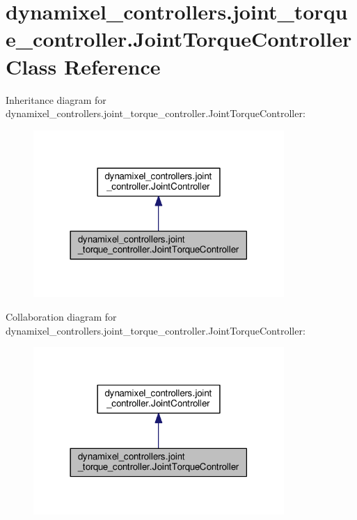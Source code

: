 \hypertarget{classdynamixel__controllers_1_1joint__torque__controller_1_1_joint_torque_controller}{}\section{dynamixel\+\_\+controllers.\+joint\+\_\+torque\+\_\+controller.\+Joint\+Torque\+Controller Class Reference}
\label{classdynamixel__controllers_1_1joint__torque__controller_1_1_joint_torque_controller}


Inheritance diagram for dynamixel\+\_\+controllers.\+joint\+\_\+torque\+\_\+controller.\+Joint\+Torque\+Controller\+:
\nopagebreak
\begin{figure}[H]
\begin{center}
\leavevmode
\includegraphics[width=270pt]{da/db8/classdynamixel__controllers_1_1joint__torque__controller_1_1_joint_torque_controller__inherit__graph}
\end{center}
\end{figure}


Collaboration diagram for dynamixel\+\_\+controllers.\+joint\+\_\+torque\+\_\+controller.\+Joint\+Torque\+Controller\+:
\nopagebreak
\begin{figure}[H]
\begin{center}
\leavevmode
\includegraphics[width=270pt]{d3/da6/classdynamixel__controllers_1_1joint__torque__controller_1_1_joint_torque_controller__coll__graph}
\end{center}
\end{figure}
